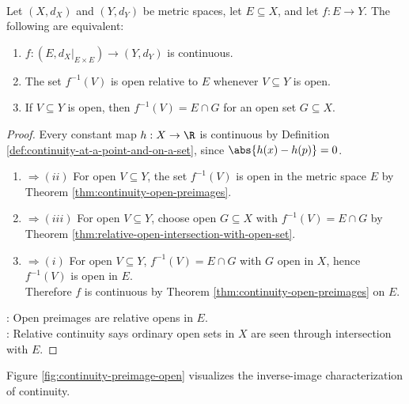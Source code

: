 \begin{proposition} \label{prop:relative-domain-continuity-open-preimages} \\
Let $(X,d_X)$ and $(Y,d_Y)$ be metric spaces, let $E\subseteq X$, and let $f:E\to Y$. The following are equivalent:
\begin{enumerate}[label=(\roman*)]
\setlength{\itemsep}{0pt}
\item $f:(E,d_X|_{E\times E})\to(Y,d_Y)$ is continuous.
\item The set $f^{-1}(V)$ is open relative to $E$ whenever $V\subseteq Y$ is open.
\item If $V\subseteq Y$ is open, then $f^{-1}(V)=E\cap G$ for an open set $G\subseteq X$.
\end{enumerate}
\begin{proof}
Every constant map $h:X\to\R$ is continuous by Definition \ref{def:continuity-at-a-point-and-on-a-set}, since $\abs{h(x)-h(p)}=0$.
\begin{enumerate}[label=(\roman*)]
\setlength{\itemsep}{0pt}
\item[$(i)$]$\Rightarrow (ii)$ For open $V\subseteq Y$, the set $f^{-1}(V)$ is open in the metric space $E$ by Theorem \ref{thm:continuity-open-preimages}.
\item[$(ii)$]$\Rightarrow (iii)$ For open $V\subseteq Y$, choose open $G\subseteq X$ with $f^{-1}(V)=E\cap G$ by Theorem \ref{thm:relative-open-intersection-with-open-set}.
\item[$(iii)$]$\Rightarrow (i)$ For open $V\subseteq Y$, $f^{-1}(V)=E\cap G$ with $G$ open in $X$, hence $f^{-1}(V)$ is open in $E$.\\
Therefore $f$ is continuous by Theorem \ref{thm:continuity-open-preimages} on $E$.
\end{enumerate}
: Open preimages are relative opens in $E$.\\
: Relative continuity says ordinary open sets in $X$ are seen through intersection with $E$.
\end{proof}
\end{proposition}

Figure \ref{fig:continuity-preimage-open} visualizes the inverse-image characterization of continuity.
\begin{illustrationfigure}[H]
  \centering
  
  \caption{Continuity pulls open sets back to open sets.}
  \label{fig:continuity-preimage-open}
\end{illustrationfigure}

